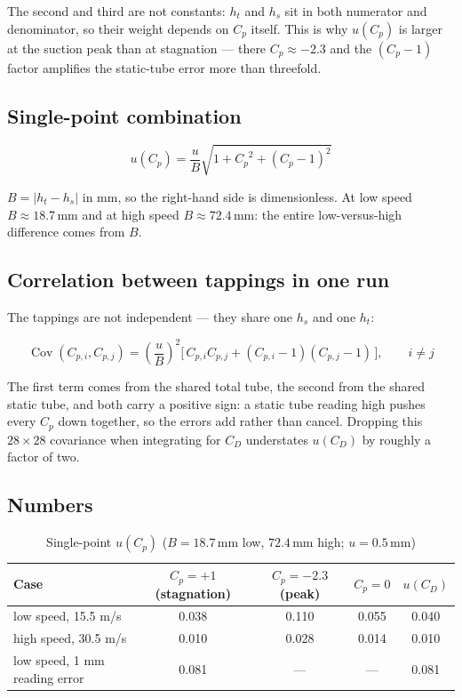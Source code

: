 \documentclass[11pt,a4paper]{article}
\newcommand{\Cp}{\ensuremath{C_p}}
\newcommand{\CD}{\ensuremath{C_D}}
\begin{document}
The second and third are not constants: $h_t$ and $h_s$ sit in both numerator and denominator, so
their weight depends on \Cp{} itself. This is why $u(\Cp)$ is larger at the suction peak than at
stagnation --- there $\Cp \approx -2.3$ and the $(\Cp - 1)$ factor amplifies the static-tube error
more than threefold.

\subsection{Single-point combination}

\begin{equation}
u(\Cp) = \frac{u}{B}\sqrt{1 + \Cp^2 + (\Cp - 1)^2}
\end{equation}

$B = |h_t - h_s|$ in mm, so the right-hand side is dimensionless. At low speed $B \approx 18.7$\,mm
and at high speed $B \approx 72.4$\,mm: the entire low-versus-high difference comes from $B$.

\subsection{Correlation between tappings in one run}

The tappings are not independent --- they share one $h_s$ and one $h_t$:

\begin{equation}
\operatorname{Cov}(C_{p,i}, C_{p,j}) = \left(\frac{u}{B}\right)^2
\bigl[\,C_{p,i} C_{p,j} + (C_{p,i} - 1)(C_{p,j} - 1)\,\bigr], \qquad i \neq j
\end{equation}

The first term comes from the shared total tube, the second from the shared static tube, and both
carry a positive sign: a static tube reading high pushes every \Cp{} down together, so the errors
add rather than cancel. Dropping this $28\times28$ covariance when integrating for \CD{} understates
$u(\CD)$ by roughly a factor of two.

\subsection{Numbers}

\begin{table}[H]
\centering
\caption{Single-point $u(\Cp)$ ($B = 18.7$\,mm low, $72.4$\,mm high; $u = 0.5$\,mm)}
\small
\begin{tabular}{@{}l c c c c@{}}
\toprule
Case & $\Cp = +1$ (stagnation) & $\Cp = -2.3$ (peak) & $\Cp = 0$ & $u(\CD)$ \\
\midrule
low speed, 15.5 m/s & 0.038 & 0.110 & 0.055 & 0.040 \\
high speed, 30.5 m/s & 0.010 & 0.028 & 0.014 & 0.010 \\
low speed, 1 mm reading error & 0.081 & --- & --- & 0.081 \\
\bottomrule
\end{tabular}
\end{table}
\end{document}

